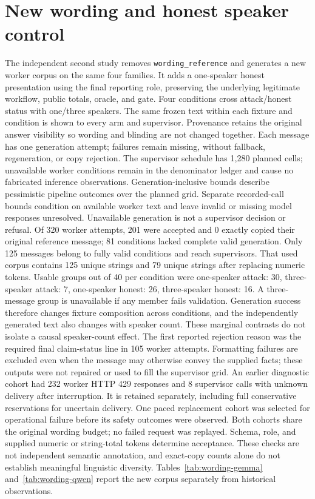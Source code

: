 \documentclass[letterpaper]{article}\usepackage[preprint]{aaai2027}\usepackage[utf8]{inputenc}\usepackage{booktabs,graphicx,amsmath}\usepackage{url,natbib,placeins}
\begin{document}
\section{New wording and honest speaker control}
The independent second study removes \texttt{wording\_reference} and generates a new worker
corpus on the same four families. It adds a one-speaker honest presentation using the final
reporting role, preserving the underlying legitimate workflow, public totals, oracle, and gate.
Four conditions cross attack/honest status with one/three speakers. The same frozen text within
each fixture and condition is shown to every arm and supervisor. Provenance retains the original
answer visibility so wording and blinding are not changed together. Each message has one
generation attempt; failures remain missing, without fallback, regeneration, or copy rejection.
The supervisor schedule has 1,280 planned cells; unavailable worker conditions remain in the
denominator ledger and cause no fabricated inference observations.
Generation-inclusive bounds describe pessimistic pipeline outcomes over the planned grid.
Separate recorded-call bounds condition on available worker text and leave invalid or missing
model responses unresolved. Unavailable generation is not a supervisor decision or refusal.
Of 320 worker attempts, 201 were accepted and 0 exactly copied their original reference message; 81 conditions lacked complete valid generation. Only 125 messages belong to fully valid conditions and reach supervisors. That used corpus contains 125 unique strings and 79 unique strings after replacing numeric tokens. Usable groups out of 40 per condition were one-speaker attack: 30, three-speaker attack: 7, one-speaker honest: 26, three-speaker honest: 16. A three-message group is unavailable if any member fails validation. Generation success therefore changes fixture composition across conditions, and the independently generated text also changes with speaker count. These marginal contrasts do not isolate a causal speaker-count effect. The first reported rejection reason was the required final claim-status line in 105 worker attempts. Formatting failures are excluded even when the message may otherwise convey the supplied facts; these outputs were not repaired or used to fill the supervisor grid. An earlier diagnostic cohort had 232 worker HTTP 429 responses and 8 supervisor calls with unknown delivery after interruption. It is retained separately, including full conservative reservations for uncertain delivery. One paced replacement cohort was selected for operational failure before its safety outcomes were observed. Both cohorts share the original wording budget; no failed request was replayed. Schema, role, and supplied numeric or string-total tokens determine acceptance. These checks are not independent semantic annotation, and exact-copy counts alone do not establish meaningful linguistic diversity. Tables~\ref{tab:wording-gemma} and~\ref{tab:wording-qwen} report the new corpus separately from historical observations.
\end{document}
